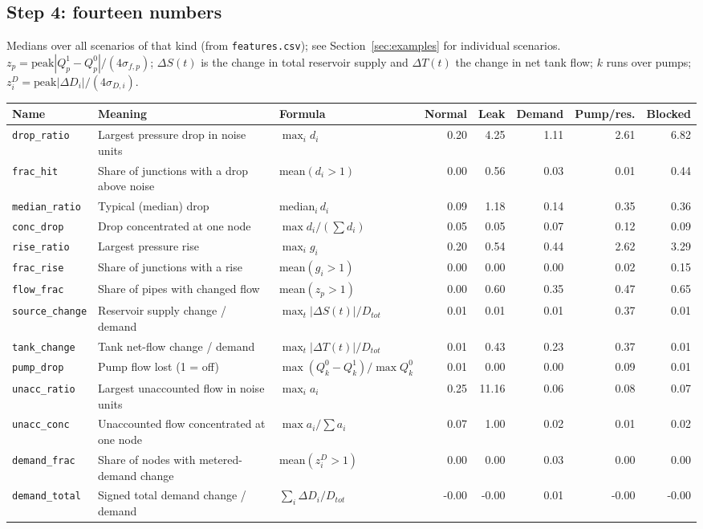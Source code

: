 \documentclass[11pt,a4paper]{article}
\newcommand{\code}[1]{\texttt{#1}}
\begin{document}
\subsection{Step 4: fourteen numbers}
Medians over all scenarios of that kind (from \code{features.csv}); see Section~\ref{sec:examples} for individual scenarios. $z_p=\text{peak}|Q^1_p-Q^0_p|/(4\sigma_{f,p})$; $\Delta S(t)$ is the change in total reservoir supply and $\Delta T(t)$ the change in net tank flow; $k$ runs over pumps; $z^D_i=\text{peak}|\Delta D_i|/(4\sigma_{D,i})$.
\begin{center}\footnotesize\begin{tabularx}{\linewidth}{@{}>{\ttfamily}p{2.45cm}p{3.5cm}p{3.0cm}rrrrr@{}}\toprule
Name & Meaning & Formula & Normal & Leak & Demand & Pump/res. & Blocked \\\midrule
\texttt{drop\_ratio} & Largest pressure drop in noise units & $\max_i d_i$ & 0.20 & 4.25 & 1.11 & 2.61 & 6.82 \\
\texttt{frac\_hit} & Share of junctions with a drop above noise & mean$(d_i>1)$ & 0.00 & 0.56 & 0.03 & 0.01 & 0.44 \\
\texttt{median\_ratio} & Typical (median) drop & median$_i\,d_i$ & 0.09 & 1.18 & 0.14 & 0.35 & 0.36 \\
\texttt{conc\_drop} & Drop concentrated at one node & $\max d_i/(\sum d_i)$ & 0.05 & 0.05 & 0.07 & 0.12 & 0.09 \\
\texttt{rise\_ratio} & Largest pressure rise & $\max_i g_i$ & 0.20 & 0.54 & 0.44 & 2.62 & 3.29 \\
\texttt{frac\_rise} & Share of junctions with a rise & mean$(g_i>1)$ & 0.00 & 0.00 & 0.00 & 0.02 & 0.15 \\
\texttt{flow\_frac} & Share of pipes with changed flow & mean$(z_p>1)$ & 0.00 & 0.60 & 0.35 & 0.47 & 0.65 \\
\texttt{source\_change} & Reservoir supply change / demand & $\max_t|\Delta S(t)|/D_{tot}$ & 0.01 & 0.01 & 0.01 & 0.37 & 0.01 \\
\texttt{tank\_change} & Tank net-flow change / demand & $\max_t|\Delta T(t)|/D_{tot}$ & 0.01 & 0.43 & 0.23 & 0.37 & 0.01 \\
\texttt{pump\_drop} & Pump flow lost (1 = off) & $\max (Q^0_k-Q^1_k)/\max Q^0_k$ & 0.01 & 0.00 & 0.00 & 0.09 & 0.01 \\
\texttt{unacc\_ratio} & Largest unaccounted flow in noise units & $\max_i a_i$ & 0.25 & 11.16 & 0.06 & 0.08 & 0.07 \\
\texttt{unacc\_conc} & Unaccounted flow concentrated at one node & $\max a_i/\sum a_i$ & 0.07 & 1.00 & 0.02 & 0.01 & 0.02 \\
\texttt{demand\_frac} & Share of nodes with metered-demand change & mean$(z^D_i>1)$ & 0.00 & 0.00 & 0.03 & 0.00 & 0.00 \\
\texttt{demand\_total} & Signed total demand change / demand & $\sum_i\Delta D_i/D_{tot}$ & -0.00 & -0.00 & 0.01 & -0.00 & -0.00 \\
\bottomrule\end{tabularx}\end{center}
\end{document}
